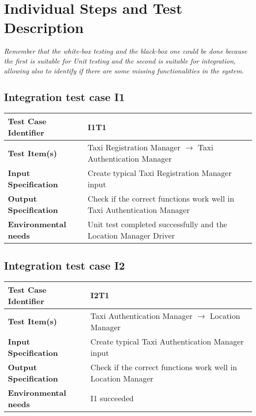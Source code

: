 \section{Individual Steps and Test Description}
\emph{Remember that the white-box testing and the black-box one could be done because the first is suitable for Unit testing and the second is suitable for integration, allowing also to identify if there are some missing functionalities in the system.}
\subsection{Integration test case I1}
\begin{tabular} {l p{9cm}}
	\hline \textbf{Test Case Identifier} & I1T1 \\
	\hline \textbf{Test Item(s)} & Taxi Registration Manager $\rightarrow$ Taxi Authentication Manager  \\
	\hline \textbf{Input Specification} & Create typical Taxi Registration Manager input \\
	\hline \textbf{Output Specification} & Check if the correct functions work well in Taxi Authentication Manager \\
	\hline \textbf{Environmental needs} & Unit test completed successfully and the Location Manager Driver \\
	\hline 
\end{tabular}
\vspace{0.5cm}
\subsection{Integration test case I2}
\begin{tabular} {l p{9cm}}
	\hline \textbf{Test Case Identifier} & I2T1 \\
	\hline \textbf{Test Item(s)} & Taxi Authentication Manager $\rightarrow$ Location Manager \\
	\hline \textbf{Input Specification} & Create typical Taxi Authentication Manager input \\
	\hline \textbf{Output Specification} & Check if the correct functions work well in Location Manager \\
	\hline \textbf{Environmental needs} & I1 succeeded \\
	\hline 
\end{tabular}
\vspace{0.5cm}
